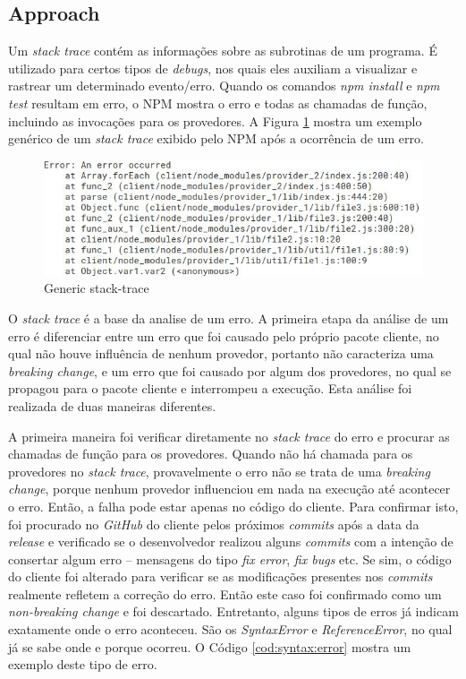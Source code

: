 \subsection{Approach}
\label{apr:rq1}
Um \textit{stack trace} contém as informações sobre as subrotinas de um programa. É utilizado para certos tipos de \textit{debugs}, nos quais eles auxiliam a visualizar e rastrear um determinado evento/erro. Quando os comandos \textit{npm install} e \textit{npm test} resultam em erro, o \Gls{NPM} mostra o erro e todas as chamadas de função, incluindo as invocações para os provedores. A Figura \ref{fig:trace} mostra um exemplo genérico de um \textit{stack trace} exibido pelo \Gls{NPM} após a ocorrência de um erro.

\begin{figure}
    \centering
    \includegraphics[scale=0.7]{figuras/stack_trace.jpeg}
    \caption{Generic stack-trace}
    \label{fig:trace}
\end{figure}{}

O \textit{stack trace} é a base da analise de um erro. A primeira etapa da análise de um erro é diferenciar entre um erro que foi causado pelo próprio pacote cliente, no qual não houve influência de nenhum provedor, portanto não caracteriza uma \textit{breaking change}, e um erro que foi causado por algum dos provedores, no qual se propagou para o pacote cliente e interrompeu a execução. Esta análise foi realizada de duas maneiras diferentes.

A primeira maneira foi verificar diretamente no \textit{stack trace} do erro e procurar as chamadas de função para os provedores. Quando não há chamada para os provedores no \textit{stack trace}, provavelmente o erro não se trata de uma \textit{breaking change}, porque nenhum provedor influenciou em nada na execução até acontecer o erro. Então, a falha pode estar apenas no código do cliente. Para confirmar isto, foi procurado no \textit{GitHub} do cliente pelos próximos \textit{commits} após a data da \textit{release} e verificado se o desenvolvedor realizou alguns \textit{commits} com a intenção de consertar algum erro -- mensagens do tipo \textit{fix error}, \textit{fix bugs} etc. Se sim, o código do cliente foi alterado para verificar se as modificações presentes nos \textit{commits} realmente refletem a correção do erro. Então este caso foi confirmado como um \textit{non-breaking change} e foi descartado. Entretanto, alguns tipos de erros já indicam exatamente onde o erro aconteceu. São os \textit{SyntaxError} e \textit{ReferenceError}, no qual já se sabe onde e porque ocorreu. O Código \ref{cod:syntax:error} mostra um exemplo deste tipo de erro.

